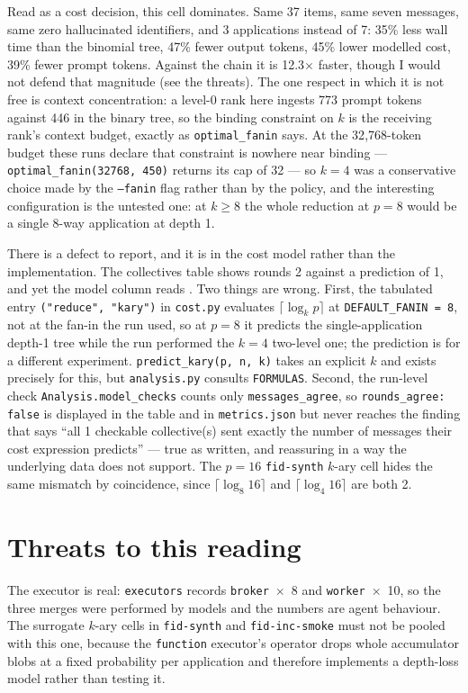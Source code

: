 \documentclass[11pt]{article}
\begin{document}
Read as a cost decision, this cell dominates. Same 37 items, same seven messages, same
zero hallucinated identifiers, and 3 applications instead of 7: 35\% less wall time than
the binomial tree, 47\% fewer output tokens, 45\% lower modelled cost, 39\% fewer prompt
tokens. Against the chain it is 12.3$\times$ faster, though I would not defend that
magnitude (see the threats). The one respect in which it is not free is context
concentration: a level-0 rank here ingests 773 prompt tokens against 446 in the binary
tree, so the binding constraint on $k$ is the receiving rank's context budget, exactly as
\texttt{optimal\_fanin} says. At the 32{,}768-token budget these runs declare that
constraint is nowhere near binding --- \texttt{optimal\_fanin(32768, 450)} returns its cap
of 32 --- so $k=4$ was a conservative choice made by the \texttt{--fanin} flag rather than
by the policy, and the interesting configuration is the untested one: at $k \ge 8$ the
whole reduction at $p=8$ would be a single 8-way application at depth 1.

There is a defect to report, and it is in the cost model rather than the implementation.
The collectives table shows rounds 2 against a prediction of 1, and yet the model column
reads \modelok. Two things are wrong. First, the tabulated entry
\texttt{("reduce", "kary")} in \texttt{cost.py} evaluates $\lceil\log_k p\rceil$ at
\texttt{DEFAULT\_FANIN = 8}, not at the fan-in the run used, so at $p=8$ it predicts the
single-application depth-1 tree while the run performed the $k=4$ two-level one; the
prediction is for a different experiment. \texttt{predict\_kary(p, n, k)} takes an explicit
$k$ and exists precisely for this, but \texttt{analysis.py} consults \texttt{FORMULAS}.
Second, the run-level check \texttt{Analysis.model\_checks} counts only
\texttt{messages\_agree}, so \texttt{rounds\_agree: false} is displayed in the table and in
\texttt{metrics.json} but never reaches the finding that says ``all 1 checkable
collective(s) sent exactly the number of messages their cost expression predicts'' --- true
as written, and reassuring in a way the underlying data does not support. The $p=16$
\texttt{fid-synth} $k$-ary cell hides the same mismatch by coincidence, since
$\lceil\log_8 16\rceil$ and $\lceil\log_4 16\rceil$ are both 2.

\section{Threats to this reading}

The executor is real: \texttt{executors} records \texttt{broker}~$\times$~8 and
\texttt{worker}~$\times$~10, so the three merges were performed by models and the numbers
are agent behaviour. The surrogate $k$-ary cells in \texttt{fid-synth} and
\texttt{fid-inc-smoke} must not be pooled with this one, because the \texttt{function}
executor's operator drops whole accumulator blobs at a fixed probability per application
and therefore implements a depth-loss model rather than testing it.
\end{document}
